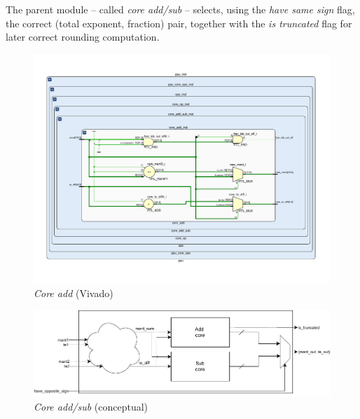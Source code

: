 The parent module -- called \textit{core add/sub} -- selects, using the \textit{have same sign} flag, the correct (total exponent, fraction) pair, together with the \textit{is truncated} flag for later correct rounding computation.

\begin{figure}
    \centering
    \includegraphics[width=\textwidth]{figures/core_add_vivado.pdf}
    \caption{\textit{Core add} (Vivado)}
    \label{fig:core_add_vivado}
\end{figure}%
\begin{figure}
    \centering
    \includegraphics[width=\textwidth]{figures/add-sub-core.drawio.pdf}
    \caption{\textit{Core add/sub} (conceptual)}
    \label{fig:core_add_sub_schematic_conc}
\end{figure}%

